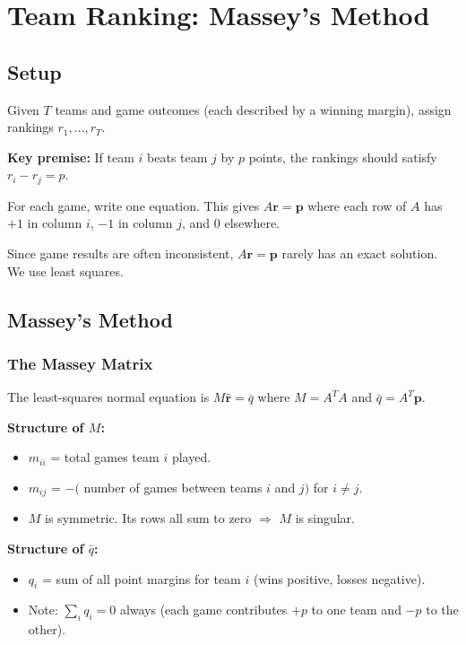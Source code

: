\chapter{Team Ranking: Massey's Method}

\section{Setup}

Given $T$ teams and game outcomes (each described by a winning margin), assign rankings $r_1,\ldots,r_T$.

\textbf{Key premise:} If team $i$ beats team $j$ by $p$ points, the rankings should satisfy $r_i - r_j = p$.

For each game, write one equation. This gives $A\mathbf{r}=\mathbf{p}$ where each row of $A$ has $+1$ in column $i$, $-1$ in column $j$, and $0$ elsewhere.

Since game results are often inconsistent, $A\mathbf{r}=\mathbf{p}$ rarely has an exact solution. We use least squares.

\section{Massey's Method}

\subsection*{The Massey Matrix}

The least-squares normal equation is $M\hat{\mathbf{r}}=\bar{q}$ where $M=A^TA$ and $\bar{q}=A^T\mathbf{p}$.

\textbf{Structure of $M$:}
\begin{itemize}
  \item $m_{ii}$ = total games team $i$ played.
  \item $m_{ij}$ = $-($ number of games between teams $i$ and $j)$ for $i\neq j$.
  \item $M$ is symmetric. Its rows all sum to zero $\Rightarrow$ $M$ is singular.
\end{itemize}

\textbf{Structure of $\bar{q}$:}
\begin{itemize}
  \item $q_i$ = sum of all point margins for team $i$ (wins positive, losses negative).
  \item Note: $\sum_i q_i = 0$ always (each game contributes $+p$ to one team and $-p$ to the other).
\end{itemize}


